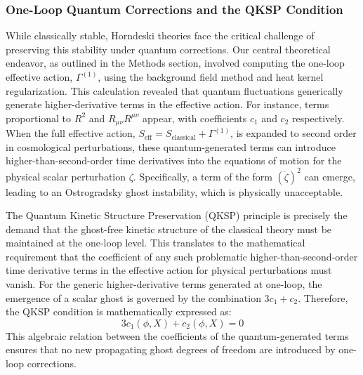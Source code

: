 \documentclass[twocolumn]{aastex631}
\begin{document}
\subsubsection{One-Loop Quantum Corrections and the QKSP Condition}
While classically stable, Horndeski theories face the critical challenge of preserving this stability under quantum corrections. Our central theoretical endeavor, as outlined in the Methods section, involved computing the one-loop effective action, $\Gamma^{(1)}$, using the background field method and heat kernel regularization. This calculation revealed that quantum fluctuations generically generate higher-derivative terms in the effective action. For instance, terms proportional to $R^2$ and $R_{\mu\nu}R^{\mu\nu}$ appear, with coefficients $c_1$ and $c_2$ respectively. When the full effective action, $S_{\text{eff}} = S_{\text{classical}} + \Gamma^{(1)}$, is expanded to second order in cosmological perturbations, these quantum-generated terms can introduce higher-than-second-order time derivatives into the equations of motion for the physical scalar perturbation $\zeta$. Specifically, a term of the form $(\ddot{\zeta})^2$ can emerge, leading to an Ostrogradsky ghost instability, which is physically unacceptable.

The Quantum Kinetic Structure Preservation (QKSP) principle is precisely the demand that the ghost-free kinetic structure of the classical theory must be maintained at the one-loop level. This translates to the mathematical requirement that the coefficient of any such problematic higher-than-second-order time derivative terms in the effective action for physical perturbations must vanish. For the generic higher-derivative terms generated at one-loop, the emergence of a scalar ghost is governed by the combination $3c_1 + c_2$. Therefore, the QKSP condition is mathematically expressed as:
$$3c_1(\phi, X) + c_2(\phi, X) = 0$$
This algebraic relation between the coefficients of the quantum-generated terms ensures that no new propagating ghost degrees of freedom are introduced by one-loop corrections.
\end{document}
